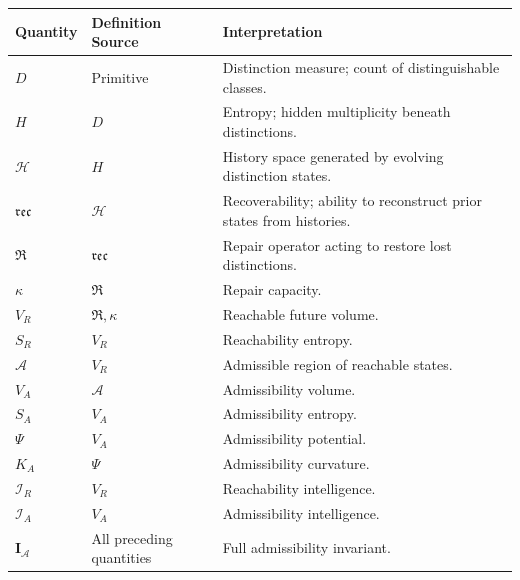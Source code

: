 \documentclass[12pt,twoside,openright]{book}
\newcommand{\hist}{\mathcal{H}}
\newcommand{\repair}{\mathfrak{R}}
\newcommand{\reco}{\mathfrak{rec}}
\begin{document}
\begin{center}
\small
\begin{longtable}{p{3cm}p{4cm}p{7cm}}
\toprule
Quantity & Definition Source & Interpretation \\
\midrule
\endhead

$D$
&
Primitive
&
Distinction measure; count of distinguishable classes.
\\

$H$
&
$D$
&
Entropy; hidden multiplicity beneath distinctions.
\\

$\hist$
&
$H$
&
History space generated by evolving distinction states.
\\

$\reco$
&
$\hist$
&
Recoverability; ability to reconstruct prior states from
histories.
\\

$\repair$
&
$\reco$
&
Repair operator acting to restore lost distinctions.
\\

$\kappa$
&
$\repair$
&
Repair capacity.
\\

$V_R$
&
$\repair,\kappa$
&
Reachable future volume.
\\

$S_R$
&
$V_R$
&
Reachability entropy.
\\

$\mathcal A$
&
$V_R$
&
Admissible region of reachable states.
\\

$V_A$
&
$\mathcal A$
&
Admissibility volume.
\\

$S_A$
&
$V_A$
&
Admissibility entropy.
\\

$\Psi$
&
$V_A$
&
Admissibility potential.
\\

$K_A$
&
$\Psi$
&
Admissibility curvature.
\\

$\mathcal I_R$
&
$V_R$
&
Reachability intelligence.
\\

$\mathcal I_A$
&
$V_A$
&
Admissibility intelligence.
\\

$\mathbf I_{\mathcal A}$
&
All preceding quantities
&
Full admissibility invariant.
\\

\bottomrule
\end{longtable}
\end{center}
\end{document}
